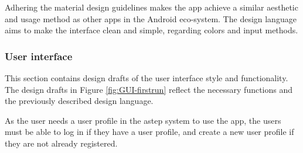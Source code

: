 Adhering the material design guidelines makes the app achieve a similar aesthetic and usage method as other apps in the Android eco-system. 
The design language aims to make the interface clean and simple, regarding colors and input methods.

\subsubsection{User interface}
This section contains design drafts of the user interface style and functionality.
The design drafts in Figure \ref{fig:GUI-firstrun} reflect the necessary functions and the previously described design language. 

As the user needs a user profile in the \gls{astep} system to use the app, the users must be able to log in if they have a user profile, and create a new user profile if they are not already registered.

